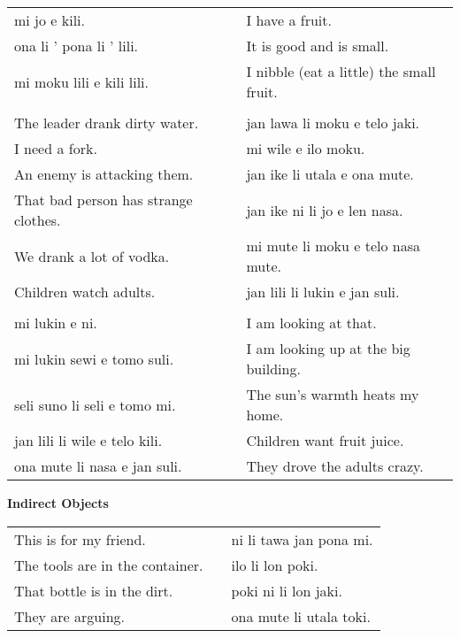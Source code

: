 \begin{supertabular}{p{5,5cm}|ll}
mi jo e kili.  &&  I have a fruit. \\
ona li ' pona li ' lili. && It is good and is small. \\
mi moku lili e kili lili.  && I nibble (eat a little) the small fruit. \\
 && \\ %
The leader drank dirty water.  && jan lawa li moku e telo jaki. \\ %
I need a fork.  && mi wile e ilo moku. \\ %
An enemy is attacking them. && jan ike li utala e ona mute. \\ %
That bad person has strange clothes.  && jan ike ni li jo e len nasa. \\ %
We drank a lot of vodka.  && mi mute li moku e telo nasa mute. \\ %
Children watch adults.  && jan lili li lukin e jan suli. \\ %
 && \\ %
mi lukin e ni. && I am looking at that. \\ 
mi lukin sewi e tomo suli.  && I am looking up at the big building. \\
seli suno li seli e tomo mi.  && The sun's warmth heats my home.  \\
jan lili li wile e telo kili.  && Children want fruit juice. \\
ona mute li nasa e jan suli.  && They drove the adults crazy. \\
\end{supertabular} 


\textbf{Indirect Objects} 
\label{'indirect_objects'}


\begin{supertabular}{p{5,5cm}|ll}
This is for my friend.  && ni li tawa jan pona mi. \\ %
The tools are in the container.  && ilo li lon poki. \\ %
That bottle is in the dirt.  && poki ni li lon jaki. \\ %
They are arguing. && ona mute li utala toki. \\ %
\end{supertabular} 





